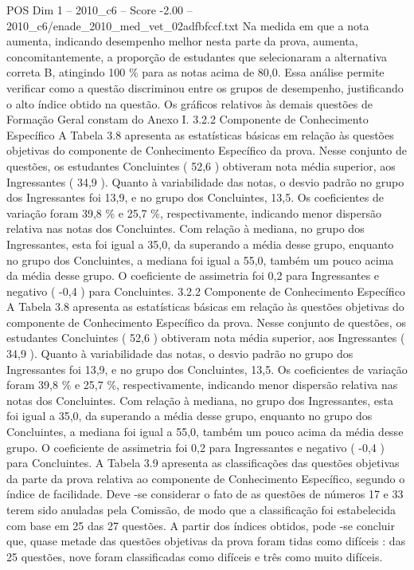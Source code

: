 \begin{textsample}{POS Dim 1 – 2010\_c6 – Score -2.00 – 2010\_c6/enade\_2010\_med\_vet\_02adfbfccf.txt}
Na medida em que a nota aumenta, indicando desempenho melhor nesta parte da prova, aumenta, concomitantemente, a proporção de estudantes que selecionaram a alternativa correta B, atingindo 100 \% para as notas acima de 80,0.
Essa análise permite verificar como a questão discriminou entre os grupos de desempenho, justificando o alto índice obtido na questão.
Os gráficos relativos às demais questões de Formação Geral constam do Anexo I. 3.2.2 Componente de Conhecimento Específico A Tabela 3.8 apresenta as estatísticas básicas em relação às questões objetivas do componente de Conhecimento Específico da prova.
Nesse conjunto de questões, os estudantes Concluintes ( 52,6 ) obtiveram nota média superior, aos Ingressantes ( 34,9 ).
Quanto à variabilidade das notas, o desvio padrão no grupo dos Ingressantes foi 13,9, e no grupo dos Concluintes, 13,5.
Os coeficientes de variação foram 39,8 \% e 25,7 \%, respectivamente, indicando menor dispersão relativa nas notas dos Concluintes.
Com relação à mediana, no grupo dos Ingressantes, esta foi igual a 35,0, da superando a média desse grupo, enquanto no grupo dos Concluintes, a mediana foi igual a 55,0, também um pouco acima da média desse grupo.
O coeficiente de assimetria foi 0,2 para Ingressantes e negativo ( -0,4 ) para Concluintes. 3.2.2 Componente de Conhecimento Específico A Tabela 3.8 apresenta as estatísticas básicas em relação às questões objetivas do componente de Conhecimento Específico da prova.
Nesse conjunto de questões, os estudantes Concluintes ( 52,6 ) obtiveram nota média superior, aos Ingressantes ( 34,9 ).
Quanto à variabilidade das notas, o desvio padrão no grupo dos Ingressantes foi 13,9, e no grupo dos Concluintes, 13,5.
Os coeficientes de variação foram 39,8 \% e 25,7 \%, respectivamente, indicando menor dispersão relativa nas notas dos Concluintes.
Com relação à mediana, no grupo dos Ingressantes, esta foi igual a 35,0, da superando a média desse grupo, enquanto no grupo dos Concluintes, a mediana foi igual a 55,0, também um pouco acima da média desse grupo.
O coeficiente de assimetria foi 0,2 para Ingressantes e negativo ( -0,4 ) para Concluintes.
A Tabela 3.9 apresenta as classificações das questões objetivas da parte da prova relativa ao componente de Conhecimento Específico, segundo o índice de facilidade.
Deve -se considerar o fato de as questões de números 17 e 33 terem sido anuladas pela Comissão, de modo que a classificação foi estabelecida com base em 25 das 27 questões.
A partir dos índices obtidos, pode -se concluir que, quase metade das questões objetivas da prova foram tidas como difíceis : das 25 questões, nove foram classificadas como difíceis e três como muito difíceis.

\end{textsample}
